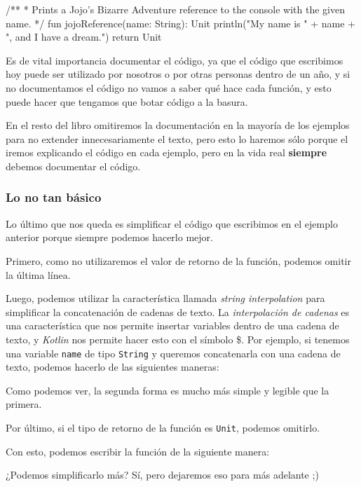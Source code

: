       \begin{kotlin}
        /**
         * Prints a Jojo's Bizarre Adventure reference to the console with the given name.
         */
        fun jojoReference(name: String): Unit {
          println("My name is " + name + ", and I have a dream.")
          return Unit
        }
      \end{kotlin}
      
      Es de vital importancia documentar el código, ya que el código que escribimos hoy puede ser
      utilizado por nosotros o por otras personas dentro de un año, y si no documentamos el código
      no vamos a saber qué hace cada función, y esto puede hacer que tengamos que botar código a la
      basura.

      En el resto del libro omitiremos la documentación en la mayoría de los ejemplos para no
      extender innecesariamente el texto, pero esto lo haremos sólo porque el iremos explicando el
      código en cada ejemplo, pero en la vida real \textbf{siempre} debemos documentar el código.

    \subsubsection{Lo no tan básico}
      Lo último que nos queda es simplificar el código que escribimos en el ejemplo anterior porque
      siempre podemos hacerlo mejor.
      
      Primero, como no utilizaremos el valor de retorno de la función, podemos omitir la última 
      línea.
      
      Luego, podemos utilizar la característica llamada \textit{string interpolation} para
      simplificar la concatenación de cadenas de texto.
      La \textit{interpolación de cadenas} es una característica que nos permite insertar variables
      dentro de una cadena de texto, y \textit{Kotlin} nos permite hacer esto con el símbolo \$.
      Por ejemplo, si tenemos una variable \texttt{name} de tipo \texttt{String} y queremos
      concatenarla con una cadena de texto, podemos hacerlo de las siguientes maneras:


      Como podemos ver, la segunda forma es mucho más simple y legible que la primera.

      Por último, si el tipo de retorno de la función es \texttt{Unit}, podemos omitirlo.

      Con esto, podemos escribir la función de la siguiente manera:


      ¿Podemos simplificarlo más?
      Sí, pero dejaremos eso para más adelante ;)